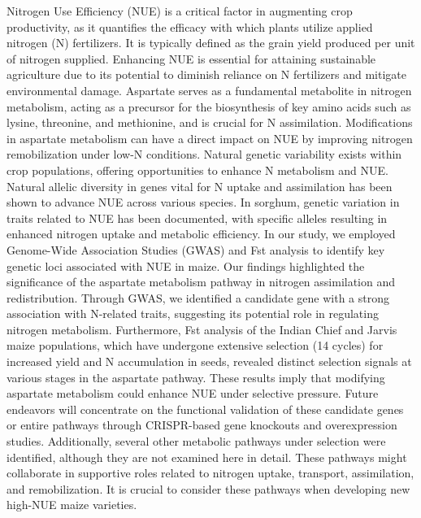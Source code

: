 \documentclass[10pt,letterpaper]{article}
\begin{document}
Nitrogen Use Efficiency (NUE) is a critical factor in augmenting crop productivity, as it quantifies the efficacy with which plants utilize applied nitrogen (N) fertilizers. It is typically defined as the grain yield produced per unit of nitrogen supplied. Enhancing NUE is essential for attaining sustainable agriculture due to its potential to diminish reliance on N fertilizers and mitigate environmental damage. Aspartate serves as a fundamental metabolite in nitrogen metabolism, acting as a precursor for the biosynthesis of key amino acids such as lysine, threonine, and methionine, and is crucial for N assimilation. Modifications in aspartate metabolism can have a direct impact on NUE by improving nitrogen remobilization under low-N conditions. Natural genetic variability exists within crop populations, offering opportunities to enhance N metabolism and NUE. Natural allelic diversity in genes vital for N uptake and assimilation has been shown to advance NUE across various species. In sorghum, genetic variation in traits related to NUE has been documented, with specific alleles resulting in enhanced nitrogen uptake and metabolic efficiency. In our study, we employed Genome-Wide Association Studies (GWAS) and Fst analysis to identify key genetic loci associated with NUE in maize. Our findings highlighted the significance of the aspartate metabolism pathway in nitrogen assimilation and redistribution. Through GWAS, we identified a candidate gene with a strong association with N-related traits, suggesting its potential role in regulating nitrogen metabolism. Furthermore, Fst analysis of the Indian Chief and Jarvis maize populations, which have undergone extensive selection (14 cycles) for increased yield and N accumulation in seeds, revealed distinct selection signals at various stages in the aspartate pathway. These results imply that modifying aspartate metabolism could enhance NUE under selective pressure. Future endeavors will concentrate on the functional validation of these candidate genes or entire pathways through CRISPR-based gene knockouts and overexpression studies. Additionally, several other metabolic pathways under selection were identified, although they are not examined here in detail. These pathways might collaborate in supportive roles related to nitrogen uptake, transport, assimilation, and remobilization. It is crucial to consider these pathways when developing new high-NUE maize varieties.
\end{document}
